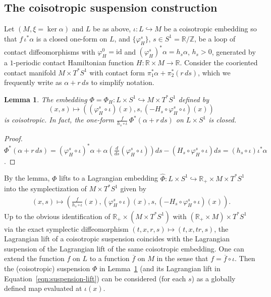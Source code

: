 \documentclass{amsart}
\newtheorem{lem}[thm]{Lemma}
\theoremstyle{remark}
\def\id{{\textrm{id}}}
\def\R{{\mathbb R}}
\def\Z{{\mathbb Z}}
\begin{document}
\subsection{The coisotropic suspension construction}
Let $(M, \xi = \ker \alpha)$ and $L$ be as above, $\iota \colon L \hookrightarrow M$ be a coisotropic embedding so that $f \, \iota^* \alpha$ is a closed one-form on $L$, and $\{ \varphi_H^s \}$, $s \in S^1 = \R / \Z$, be a loop of contact diffeomorphisms with $\varphi_H^0 = \id$ and $(\varphi_H^s)^* \alpha = h_s \alpha$, $h_s > 0$, generated by a $1$-periodic contact Hamiltonian function $H \colon \R \times M \to \R$.
Consider the cooriented contact manifold $M \times T^* S^1$ with contact form $\pi_1^* \alpha + \pi_2^* (r \, ds)$, which we frequently write as $\alpha + r \, ds$ to simplify notation.

\begin{lem} \label{lem:suspension}
The embedding $\Phi = \Phi_H \colon L \times S^1 \hookrightarrow M \times T^* S^1$ defined by \[ (x, s) \mapsto \left( (\varphi_H^s \circ \iota) (x), s, \left( - H_s \circ \varphi_H^s \circ \iota \right) (x) \right) \] is coisotropic.
In fact, the one-form $\displaystyle \frac{f}{h_s \circ \iota} \, \Phi^* (\alpha + r \, ds)$ on $L \times S^1$ is closed.
\end{lem}

\begin{proof}
$\Phi^* (\alpha + r \, ds) = (\varphi_H^s \circ \iota)^* \alpha + \alpha ( \frac{d}{ds} (\varphi_H^s \circ \iota) ) ds - (H_s \circ \varphi_H^s \circ \iota) ds = (h_s \circ \iota) \iota^* \alpha$.
\end{proof}

By the lemma, $\Phi$ lifts to a Lagrangian embedding $\widehat{\Phi} \colon L \times S^1 \hookrightarrow \R_+ \times M \times T^* S^1$ into the symplectization of $M \times T^* S^1$ given by
\begin{align} \label{eqn:suspension-lift}
(x, s) \mapsto \left( \frac{f}{h_s \circ \iota} (x), (\varphi_H^s \circ \iota) (x), s, \left( - H_s \circ \varphi_H^s \circ \iota \right) (x) \right).
\end{align}
Up to the obvious identification of $\R_+ \times (M \times T^* S^1)$ with $(\R_+ \times M) \times T^* S^1$ via the exact symplectic diffeomorphism $(t, x, r, s) \mapsto (t, x, t r, s)$, the Lagrangian lift of a coisotropic suspension coincides with the Lagrangian suspension of the Lagrangian lift of the same coisotropic embedding.
One can extend the function $f$ on $L$ to a function $\overline{f}$ on $M$ in the sense that $f = \overline{f} \circ \iota$.
Then the (coisotropic) suspension $\Phi$ in Lemma~\ref{lem:suspension} (and its Lagrangian lift in Equation~\ref{eqn:suspension-lift}) can be considered (for each $s$) as a globally defined map evaluated at $\iota (x)$.
\end{document}
